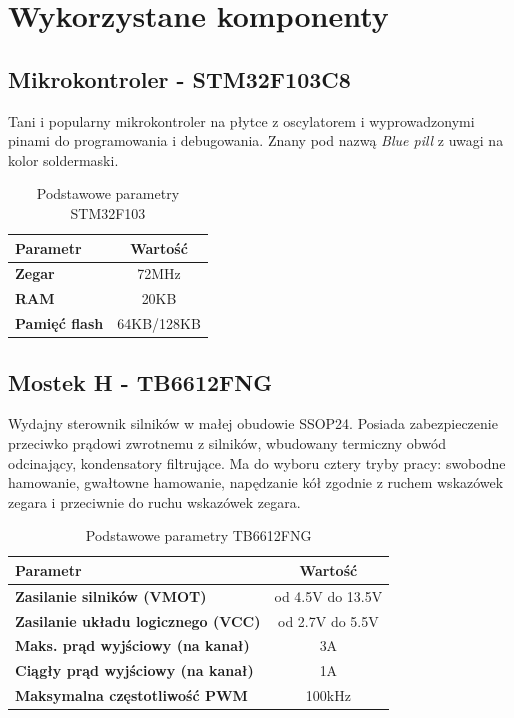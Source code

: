 \documentclass[10pt, a4paper]{article}
\begin{document}
\section{Wykorzystane komponenty}
\subsection{Mikrokontroler - STM32F103C8\cite{MCU}}
\noindent Tani i popularny mikrokontroler na płytce z oscylatorem i wyprowadzonymi pinami do programowania i debugowania. Znany pod nazwą \textit{Blue pill} z uwagi na kolor soldermaski.

\begin{table}[H]
	\centering
	\begin{tabular}{|l|c|} \hline
		\textbf{Parametr} & Wartość \\
		\hline
		\hline  \textbf{Zegar}& 72MHz\\\hline
		\textbf{RAM} & 20KB\\
		\hline
		\textbf{Pamięć flash} & 64KB/128KB\\
		\hline
	\end{tabular}
	\caption{Podstawowe parametry STM32F103}
	\label{tab:MCU}
\end{table}

\subsection{Mostek H - TB6612FNG\cite{Toshiba}}
\noindent Wydajny sterownik silników w małej obudowie SSOP24. Posiada zabezpieczenie przeciwko prądowi zwrotnemu z silników, wbudowany termiczny obwód odcinający, kondensatory filtrujące. Ma do wyboru cztery tryby pracy: swobodne hamowanie, gwałtowne hamowanie, napędzanie kół zgodnie z ruchem wskazówek zegara i przeciwnie do ruchu wskazówek zegara. 

\begin{table}[H]
	\centering
	\begin{tabular}{|l|c|} \hline
		\textbf{Parametr} & Wartość \\
		\hline
		\hline  \textbf{Zasilanie silników (VMOT)}& od 4.5V do 13.5V\\\hline
		\textbf{Zasilanie układu logicznego (VCC)} & od 2.7V do 5.5V\\
		\hline
		\textbf{Maks. prąd wyjściowy (na kanał)} & 3A\\
		\hline
				\textbf{Ciągły prąd wyjściowy (na kanał)} & 1A\\
		\hline
				\textbf{Maksymalna częstotliwość PWM} & 100kHz\\
		\hline
	\end{tabular}
	\caption{Podstawowe parametry TB6612FNG}
	\label{tab:Toshiba}
\end{table}
\newpage
\end{document}

